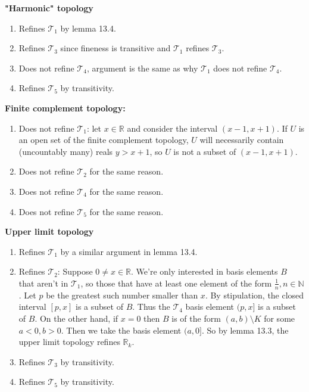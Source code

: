 \documentclass[paper=a4, fontsize=11pt]{scrartcl} %
\newcommand{\script}{\mathcal}
\numberwithin{equation}{section}    %
\numberwithin{figure}{section}      %
\numberwithin{table}{section}       %
\begin{document}
\textbf {"Harmonic" topology}
\begin{enumerate}
  \item Refines $\script T_1$ by lemma 13.4.
  \item Refines $\script T_3$ since fineness is transitive and $\script T_1$
    refines $\script T_3$.
  \item Does not refine $\script T_4$, argument is the same as why $\script T_1$
    does not refine $\script T_4$.
  \item Refines $\script T_5$ by transitivity.
\end{enumerate}

\textbf {Finite complement topology:}
\begin{enumerate}
  \item Does not refine $\script T_1$: let $x \in \mathbb R$ and consider the
    interval $(x-1, x+1)$. If $U$ is an open set of the finite complement
    topology, $U$ will necessarily contain (uncountably many) reals $y > x+1$,
    so $U$ is not a subset of $(x-1, x+1)$.
  \item Does not refine $\script T_2$ for the same reason.
  \item Does not refine $\script T_4$ for the same reason.
  \item Does not refine $\script T_5$ for the same reason.
\end{enumerate}

\textbf {Upper limit topology}
\begin{enumerate}
  \item Refines $\script T_1$ by a similar argument in lemma 13.4.
  \item Refines $\script T_2$: Suppose $0 \neq x \in \mathbb R$. We're only
    interested in basis elements $B$ that aren't in $\script T_1$, so those that have
    at least one element of the form $\frac{1}{n}, n \in \mathbb N$. Let $p$
    be the greatest such number smaller than $x$. By stipulation, the closed
    interval $[p, x]$ is a subset of $B$. Thus the $\script T_4$ basis element
    $(p, x]$ is a subset of $B$.
    On the other hand, if $x = 0$ then $B$ is of the form $(a, b) \setminus K$
    for some $a < 0, b > 0$. Then we take the basis element $(a, 0]$.
    So by lemma 13.3, the upper limit topology refines $\mathbb R_k$.
  \item Refines $\script T_3$ by transitivity.
  \item Refines $\script T_5$ by transitivity.
\end{enumerate}
\end{document}
